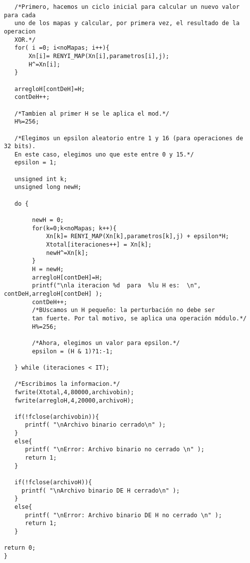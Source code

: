 \documentclass[12pt,3p]{elsarticle}
\begin{document}
\begin{verbatim}
   /*Primero, hacemos un ciclo inicial para calcular un nuevo valor para cada
   uno de los mapas y calcular, por primera vez, el resultado de la operacion
   XOR.*/
   for( i =0; i<noMapas; i++){
       Xn[i]= RENYI_MAP(Xn[i],parametros[i],j);
       H^=Xn[i];
   }
   
   arregloH[contDeH]=H; 
   contDeH++;
    
   /*Tambien al primer H se le aplica el mod.*/
   H%=256; 
 
   /*Elegimos un epsilon aleatorio entre 1 y 16 (para operaciones de 32 bits).
   En este caso, elegimos uno que este entre 0 y 15.*/
   epsilon = 1;   
   
   unsigned int k;
   unsigned long newH;

   do {
        
        newH = 0;
        for(k=0;k<noMapas; k++){            
            Xn[k]= RENYI_MAP(Xn[k],parametros[k],j) + epsilon*H;  
            Xtotal[iteraciones++] = Xn[k];
            newH^=Xn[k];      
        }
        H = newH;
        arregloH[contDeH]=H;
        printf("\nla iteracion %d  para  %lu H es:  \n", contDeH,arregloH[contDeH] );
        contDeH++;
        /*BUscamos un H pequeño: la perturbación no debe ser 
        tan fuerte. Por tal motivo, se aplica una operación módulo.*/
        H%=256; 
        
        /*Ahora, elegimos un valor para epsilon.*/
        epsilon = (H & 1)?1:-1;
    
   } while (iteraciones < IT);
   
   /*Escribimos la informacion.*/
   fwrite(Xtotal,4,80000,archivobin); 
   fwrite(arregloH,4,20000,archivoH); 
  
   if(!fclose(archivobin)){
      printf( "\nArchivo binario cerrado\n" );
   }
   else{
      printf( "\nError: Archivo binario no cerrado \n" );
      return 1;
   }
   
   if(!fclose(archivoH)){
     printf( "\nArchivo binario DE H cerrado\n" );
   }
   else{
      printf( "\nError: Archivo binario DE H no cerrado \n" );
      return 1;
   }
   
return 0;
}
\end{verbatim}
\end{document}
